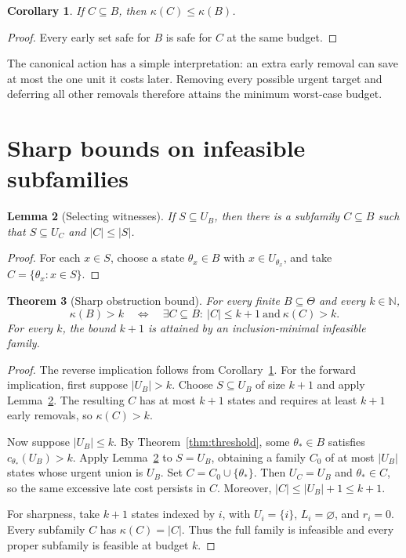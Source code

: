 \documentclass[11pt,a4paper]{amsart}
\newtheorem{theorem}{Theorem}[section]
\newtheorem{lemma}[theorem]{Lemma}
\newtheorem{corollary}[theorem]{Corollary}
\theoremstyle{definition}
\theoremstyle{remark}
\newcommand{\N}{\mathbb N}
\newcommand{\card}[1]{\lvert #1\rvert}
\begin{document}
\begin{corollary}\label{cor:mono}
If $C\subseteq B$, then $\kappa(C)\le\kappa(B)$.
\end{corollary}
\begin{proof}
Every early set safe for $B$ is safe for $C$ at the same budget.
\end{proof}

The canonical action has a simple interpretation: an extra early removal
can save at most the one unit it costs later. Removing every possible urgent
target and deferring all other removals therefore attains the minimum
worst-case budget.

\section{Sharp bounds on infeasible subfamilies}\label{sec:bounds}

\begin{lemma}[Selecting witnesses]\label{lem:witness}
If $S\subseteq U_B$, then there is a subfamily $C\subseteq B$ such that
$S\subseteq U_C$ and $\card C\le\card S$.
\end{lemma}
\begin{proof}
For each $x\in S$, choose a state $\theta_x\in B$ with $x\in U_{\theta_x}$,
and take $C=\{\theta_x:x\in S\}$.
\end{proof}

\begin{theorem}[Sharp obstruction bound]\label{thm:helly}
For every finite $B\subseteq\Theta$ and every $k\in\N$,
\begin{equation}\label{eq:helly}
 \kappa(B)>k
 \quad\Longleftrightarrow\quad
 \exists C\subseteq B:\ \card C\le k+1\ \text{and}\ \kappa(C)>k.
\end{equation}
For every $k$, the bound $k+1$ is attained by an inclusion-minimal
infeasible family.
\end{theorem}
\begin{proof}
The reverse implication follows from Corollary~\ref{cor:mono}. For the
forward implication, first suppose $\card{U_B}>k$. Choose
$S\subseteq U_B$ of size $k+1$ and apply Lemma~\ref{lem:witness}.
The resulting $C$ has at most $k+1$ states and requires at least $k+1$
early removals, so $\kappa(C)>k$.

Now suppose $\card{U_B}\le k$. By Theorem~\ref{thm:threshold}, some
$\theta_*\in B$ satisfies $c_{\theta_*}(U_B)>k$. Apply
Lemma~\ref{lem:witness} to $S=U_B$, obtaining a family $C_0$ of at most
$\card{U_B}$ states whose urgent union is $U_B$. Set
$C=C_0\cup\{\theta_*\}$. Then $U_C=U_B$ and $\theta_*\in C$,
so the same excessive late cost persists in $C$. Moreover,
$\card C\le\card{U_B}+1\le k+1$.

For sharpness, take $k+1$ states indexed by $i$, with $U_i=\{i\}$,
$L_i=\varnothing$, and $r_i=0$. Every subfamily $C$ has
$\kappa(C)=\card C$. Thus the full family is infeasible and every
proper subfamily is feasible at budget $k$.
\end{proof}
\end{document}
